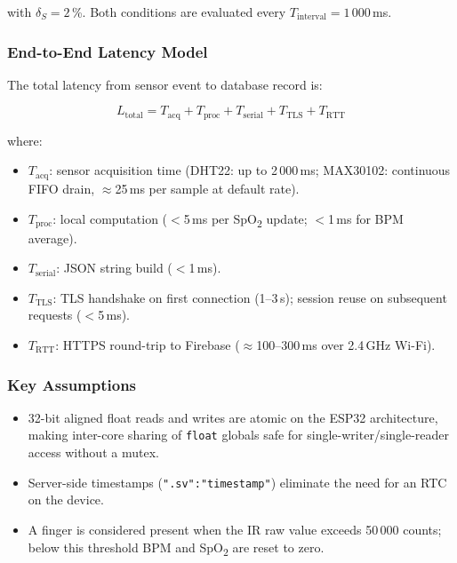 with $\delta_S = 2$\,\%.
Both conditions are evaluated every $T_{\text{interval}} = 1\,000$\,ms.

\subsubsection{End-to-End Latency Model}

The total latency from sensor event to database record is:

\begin{equation}
	L_{\text{total}} = T_{\text{acq}} + T_{\text{proc}} + T_{\text{serial}} +
	T_{\text{TLS}} + T_{\text{RTT}}
	\label{eq:latency}
\end{equation}

where:
\begin{itemize}
	\item $T_{\text{acq}}$: sensor acquisition time (DHT22: up to 2\,000\,ms;
	      MAX30102: continuous FIFO drain, $\approx$25\,ms per sample at default rate).
	\item $T_{\text{proc}}$: local computation ($<$5\,ms per SpO\textsubscript{2}
	      update; $<$1\,ms for BPM average).
	\item $T_{\text{serial}}$: JSON string build ($<$1\,ms).
	\item $T_{\text{TLS}}$: TLS handshake on first connection (1--3\,s);
	      session reuse on subsequent requests ($<$5\,ms).
	\item $T_{\text{RTT}}$: HTTPS round-trip to Firebase
	      ($\approx$100--300\,ms over 2.4\,GHz Wi-Fi).
\end{itemize}

\subsubsection{Key Assumptions}

\begin{itemize}
	\item 32-bit aligned float reads and writes are atomic on the ESP32
	      architecture, making inter-core sharing of \texttt{float} globals safe for
	      single-writer/single-reader access without a mutex.
	\item Server-side timestamps (\texttt{".sv":"timestamp"}) eliminate the need
	      for an RTC on the device.
	\item A finger is considered present when the IR raw value exceeds 50\,000 counts;
	      below this threshold BPM and SpO\textsubscript{2} are reset to zero.
\end{itemize}

